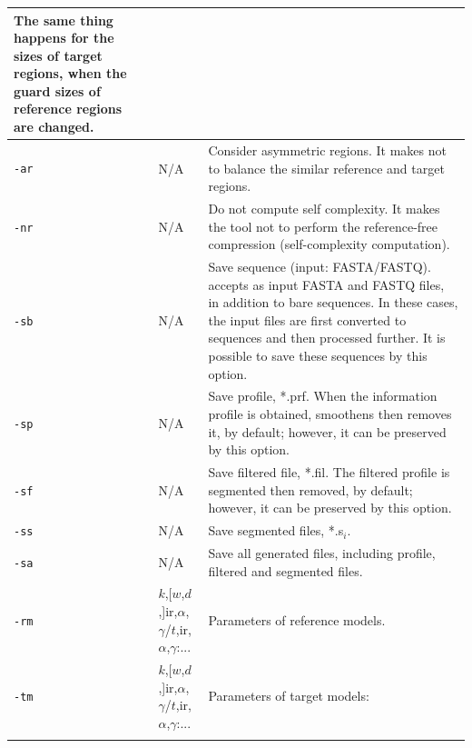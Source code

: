 \documentclass[a4paper,9pt]{extarticle}
\newcommand*{\method}[1]{\text{#1}\xspace}
\newcommand*{\smashpp}   {\method{Smash++}}
\newcommand*{\fasta}     {FASTA\xspace}
\newcommand*{\fastq}     {FASTQ\xspace}
\newcommand*{\mono}[1]{\lstinline|#1|}
\begin{document}
\begin{small}
\begin{tabularx}{\linewidth}{@{}lp{2.9cm}X@{}}
  The same thing happens for the sizes of target regions, when the guard sizes of reference regions are changed. \\
  \midrule
  \mono{-ar} & N/A & Consider asymmetric regions. It makes \smashpp not to balance the similar reference and target regions. \\
  \midrule
  \mono{-nr} & N/A & Do not compute self complexity. It makes the tool not to perform the reference-free compression (self-complexity computation). \\
  \midrule
  \mono{-sb} & N/A & Save sequence (input: FASTA/FASTQ). \smashpp accepts as input \fasta and \fastq files, in addition to bare sequences. In these cases, the input files are first converted to sequences and then processed further. It is possible to save these sequences by this option. \\
  \midrule
  \mono{-sp} & N/A & Save profile, *.prf. When the information profile is obtained, \smashpp smoothens then removes it, by default; however, it can be preserved by this option. \\
  \midrule
  \mono{-sf} & N/A & Save filtered file, *.fil. The filtered profile is segmented then removed, by default; however, it can be preserved by this option. \\
  \midrule
  \mono{-ss} & N/A & Save segmented files, *.s$_i$. \\
  \midrule
  \mono{-sa} & N/A & Save all generated files, including profile, filtered and segmented files. \\
  \midrule
  \mono{-rm} & $k$,[$w$,$d$,]ir,$\alpha$,$\gamma$/$t$,ir,$\alpha$,$\gamma$:... & Parameters of reference models. \\
  \mono{-tm} & $k$,[$w$,$d$,]ir,$\alpha$,$\gamma$/$t$,ir,$\alpha$,$\gamma$:... & Parameters of target models: \\
& {}\newline{}{\scalebox{0.75}{$14,0,0.001,0.95/5,0,0.001,0.95$}}

\end{tabularx}
\end{small}
\end{document}
